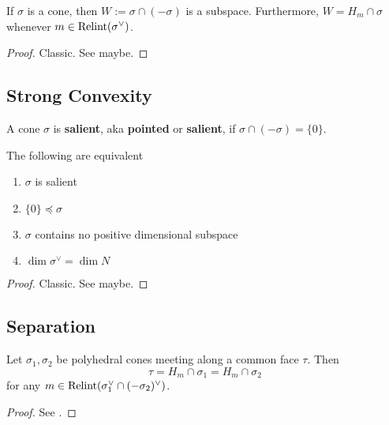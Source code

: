 \begin{lemma}
  \label{1-2-minimal-face}

  If $\sigma$ is a cone, then $W := \sigma \cap (-\sigma)$ is a subspace. Furthermore,
  $W = H_m \cap \sigma$ whenever $m \in \operatorname{Relint}(\sigma^\vee)$.
\end{lemma}
\begin{proof}
  \uses{}

  Classic. See \cite{Oda_1988} maybe.
\end{proof}


\subsection{Strong Convexity}


\begin{definition}
  \label{1-2-12-salient-cone}
  \uses{}

  A cone $\sigma$ is {\bf salient}, aka {\bf pointed} or {
    \bf salient}, if $\sigma \cap (-\sigma) = \{0\}$.
\end{definition}


\begin{proposition}
  \label{1-2-12-salient-cone-tfae}

  The following are equivalent
  \begin{enumerate}
    \item $\sigma$
     is salient
    \item $\{0\} \preceq \sigma$
    \item $\sigma$ contains no positive dimensional subspace
    \item $\dim \sigma^\vee = \dim N$
  \end{enumerate}
\end{proposition}
\begin{proof}
  \uses{}

  Classic. See \cite{Oda_1988} maybe.
\end{proof}


\subsection{Separation}


\begin{lemma}
  \label{1-2-13-separation-lemma}

  Let $\sigma_1, \sigma_2$ be polyhedral cones meeting along a common face $\tau$. Then
  $$\tau = H_m \cap \sigma_1 = H_m \cap \sigma_2$$
  for any $m \in \operatorname{Relint}(\sigma_1^\vee \cap (-\sigma_2)^\vee)$.
\end{lemma}
\begin{proof}

  See \cite{Cox_2011}.
\end{proof}


